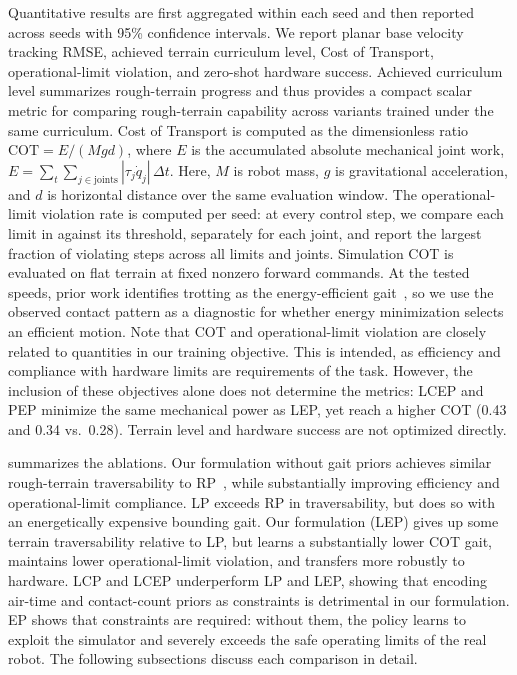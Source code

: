 \documentclass{article}
\newcommand{\baselineOne}{LCP}
\newcommand{\baselineTwo}{LP}
\newcommand{\baselineThree}{LCEP}
\newcommand{\baselineFour}{LEP}
\newcommand{\baselineFive}{RP}
\newcommand{\baselineSix}{EP}
\begin{document}
    Quantitative results are first aggregated within each seed and then reported across seeds with 95\% confidence intervals. We report planar base velocity tracking RMSE, achieved terrain curriculum level, Cost of Transport, operational-limit violation, and zero-shot hardware success. Achieved curriculum level summarizes rough-terrain progress and thus provides a compact scalar metric for comparing rough-terrain capability across variants trained under the same curriculum. Cost of Transport is computed as the dimensionless ratio \(\mathrm{COT}=E/(Mgd)\), where \(E\) is the accumulated absolute mechanical joint work, \(E=\sum_t \sum_{j\in\mathrm{joints}} |\tau_j \dot q_j|\,\Delta t\). Here, \(M\) is robot mass, \(g\) is gravitational acceleration, and \(d\) is horizontal distance over the same evaluation window. The operational-limit violation rate is computed per seed: at every control step, we compare each limit in  against its threshold, separately for each joint, and report the largest fraction of violating steps across all limits and joints. Simulation COT is evaluated on flat terrain at fixed nonzero forward commands. At the tested speeds, prior work identifies trotting as the energy-efficient gait~\citep{xiSelectingGaitsEconomical2016,yangFastEfficientLocomotion2022}, so we use the observed contact pattern as a diagnostic for whether energy minimization selects an efficient motion. Note that COT and operational-limit violation are closely related to quantities in our training objective. This is intended, as efficiency and compliance with hardware limits are requirements of the task. However, the inclusion of these objectives alone does not determine the metrics: \baselineThree{} and PEP minimize the same mechanical power as \baselineFour{}, yet reach a higher COT (0.43 and 0.34 vs.\ 0.28). Terrain level and hardware success are not optimized directly.
    
     summarizes the ablations. Our formulation without gait priors achieves similar rough-terrain traversability to \baselineFive{}~\citep{rudinLearningWalkMinutes2022a}, while substantially improving efficiency and operational-limit compliance. \baselineTwo{} exceeds \baselineFive{} in traversability, but does so with an energetically expensive bounding gait. Our formulation (\baselineFour{}) gives up some terrain traversability relative to \baselineTwo, but learns a substantially lower COT gait, maintains lower operational-limit violation, and transfers more robustly to hardware. \baselineOne{} and \baselineThree{} underperform \baselineTwo{} and \baselineFour{}, showing that encoding air-time and contact-count priors as constraints is detrimental in our formulation. \baselineSix{} shows that constraints are required: without them, the policy learns to exploit the simulator and severely exceeds the safe operating limits of the real robot. The following subsections discuss each comparison in detail.
\end{document}
